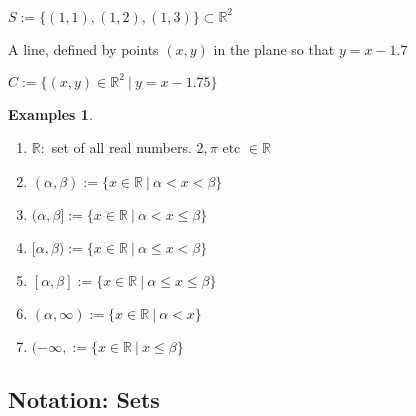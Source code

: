 \documentclass[twocolumn,20pt,fleqn]{extarticle}
\newcommand{\alert}[1]{{\color{red} #1}}
\newcommand{\sep}{\vspace{0.5cm}}
\theoremstyle{plain}
\theoremstyle{definition}
\newtheorem*{exmpls}{Examples}
\theoremstyle{remark}
\newenvironment*{examples}{\begin{exmpls} ~ \begin{enumerate}}{\end{enumerate}\end{exmpls}}
\begin{document}
\newpage

 $ S:= \{(1,1), (1,2), (1,3)\}  \subset \mathbb{R}^2 $  
\sep


















A line, defined by  \alert{points $(x,y)$} \alert{in the plane}  \alert{so that} \alert{$y = x - 1.7$} 


$ C:= \{(x,y) \in \mathbb{R}^2 \ |\ y = x - 1.75 \}$
 

\sep

\begin{examples}
\item $\mathbb{R}:$ set of all real numbers. $2, \pi \textrm{ etc } \in \mathbb{R}$
  \item $ (\alpha,  \beta) := \{x \in \mathbb{R} \ |\  \alpha < x  < \beta \}$
  
  
  \item $ (\alpha,  \beta] := \{x \in \mathbb{R} \ |\  \alpha < x  \leq \beta \}$
  
  
  \item $ [\alpha,  \beta) := \{x \in \mathbb{R} \ |\  \alpha \leq x  < \beta \}$
  
  
  \item $ [\alpha,  \beta] := \{x \in \mathbb{R} \ |\  \alpha \leq x  \leq \beta \}$
  
  
  \item $ (\alpha,  \infty) := \{x \in \mathbb{R} \ |\  \alpha < x \}$
  
  
  \item $ (-\infty,  := \{x \in \mathbb{R} \ |\  x \leq \beta \}$
  
  \end{examples}



\clearpage


\subsection{Notation: Sets}


\end{document}

